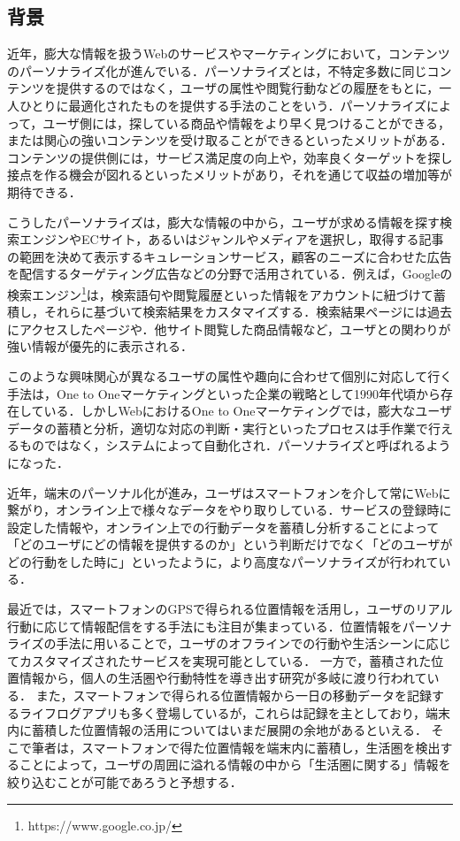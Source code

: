 \documentclass[a4paper]{jsarticle}
\begin{document}
\subsection{背景}
近年，膨大な情報を扱うWebのサービスやマーケティングにおいて，コンテンツのパーソナライズ化が進んでいる．パーソナライズとは，不特定多数に同じコンテンツを提供するのではなく，ユーザの属性や閲覧行動などの履歴をもとに，一人ひとりに最適化されたものを提供する手法のことをいう．パーソナライズによって，ユーザ側には，探している商品や情報をより早く見つけることができる，または関心の強いコンテンツを受け取ることができるといったメリットがある．コンテンツの提供側には，サービス満足度の向上や，効率良くターゲットを探し接点を作る機会が図れるといったメリットがあり，それを通じて収益の増加等が期待できる\cite{izumi}．

こうしたパーソナライズは，膨大な情報の中から，ユーザが求める情報を探す検索エンジンやECサイト，あるいはジャンルやメディアを選択し，取得する記事の範囲を決めて表示するキュレーションサービス，顧客のニーズに合わせた広告を配信するターゲティング広告などの分野で活用されている．例えば，Googleの検索エンジン\footnote{https://www.google.co.jp/}は，検索語句や閲覧履歴といった情報をアカウントに紐づけて蓄積し，それらに基づいて検索結果をカスタマイズする．検索結果ページには過去にアクセスしたページや．他サイト閲覧した商品情報など，ユーザとの関わりが強い情報が優先的に表示される．

このような興味関心が異なるユーザの属性や趣向に合わせて個別に対応して行く手法は，One to Oneマーケティングといった企業の戦略として1990年代頃から存在している\cite{okunuki}．しかしWebにおけるOne to Oneマーケティングでは，膨大なユーザデータの蓄積と分析，適切な対応の判断・実行といったプロセスは手作業で行えるものではなく，システムによって自動化され．パーソナライズと呼ばれるようになった．

近年，端末のパーソナル化が進み，ユーザはスマートフォンを介して常にWebに繋がり，オンライン上で様々なデータをやり取りしている．サービスの登録時に設定した情報や，オンライン上での行動データを蓄積し分析することによって「どのユーザにどの情報を提供するのか」という判断だけでなく「どのユーザがどの行動をした時に」といったように，より高度なパーソナライズが行われている\cite{mochimaru}．

最近では，スマートフォンのGPSで得られる位置情報を活用し，ユーザのリアル行動に応じて情報配信をする手法にも注目が集まっている．位置情報をパーソナライズの手法に用いることで，ユーザのオフラインでの行動や生活シーンに応じてカスタマイズされたサービスを実現可能としている\cite{tameco}\cite{bitblend}．
一方で，蓄積された位置情報から，個人の生活圏や行動特性を導き出す研究が多岐に渡り行われている\cite{matsuo}\cite{docomo}．
また，スマートフォンで得られる位置情報から一日の移動データを記録するライフログアプリも多く登場しているが，これらは記録を主としており，端末内に蓄積した位置情報の活用についてはいまだ展開の余地があるといえる．
そこで筆者は，スマートフォンで得た位置情報を端末内に蓄積し，生活圏を検出することによって，ユーザの周囲に溢れる情報の中から「生活圏に関する」情報を絞り込むことが可能であろうと予想する．
\end{document}
